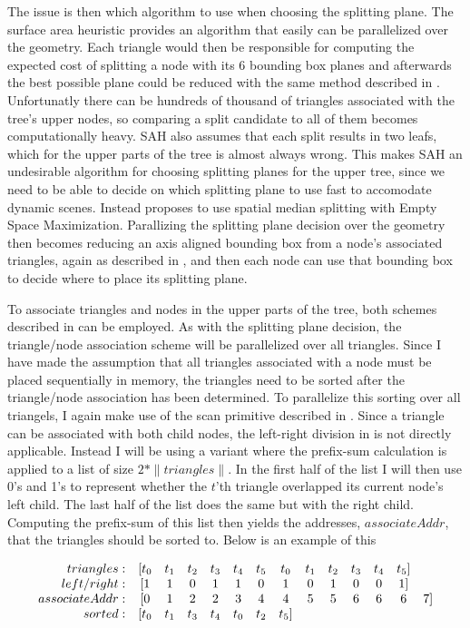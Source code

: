 The issue is then which algorithm to use when choosing the splitting plane. The
surface area heuristic provides an algorithm that easily can be parallelized
over the geometry. Each triangle would then be responsible for computing the
expected cost of splitting a node with its 6 bounding box planes and afterwards
the best possible plane could be reduced with the same method described in
. Unfortunatly there can be hundreds of thousand of
triangles associated with the tree's upper nodes, so comparing a split candidate
to all of them becomes computationally heavy. SAH also assumes that each split
results in two leafs, which for the upper parts of the tree is almost always
wrong. This makes SAH an undesirable algorithm for choosing splitting planes for
the upper tree, since we need to be able to decide on which splitting plane to
use fast to accomodate dynamic scenes. Instead \zhou{} proposes to use spatial
median splitting with Empty Space Maximization. Parallizing the splitting plane
decision over the geometry then becomes reducing an axis aligned bounding box
from a node's associated triangles, again as described in
, and then each node can use that bounding box to decide
where to place its splitting plane.

To associate triangles and nodes in the upper parts of the tree, both schemes
described in  can be employed. As with the
splitting plane decision, the triangle/node association scheme will be
parallelized over all triangles. Since I have made the assumption that all
triangles associated with a node must be placed sequentially in memory, the
triangles need to be sorted after the triangle/node association has been
determined. To parallelize this sorting over all triangels, I again make use of
the scan primitive described in . Since a triangle can
be associated with both child nodes, the left-right division in
 is not directly applicable. Instead I will be using a
variant where the prefix-sum calculation is applied to a list of size $2 *
\|triangles\|$. In the first half of the list I will then use 0's and 1's to
represent whether the $t$'th triangle overlapped its current node's left
child. The last half of the list does the same but with the right
child. Computing the prefix-sum of this list then yields the addresses,
$associateAddr$, that the triangles should be sorted to. Below is an example of
this

\begin{displaymath}
  \begin{array}{r c c c c c c c c c c c c c}
    triangles: & [t_0 & t_1 & t_2 & t_3 & t_4 & t_5 & t_0 & t_1 & t_2 & t_3 & t_4 & t_5]\\
    left/right: & [1 & 1 & 0 & 1 & 1 & 0 & 1 & 0 & 1 & 0 & 0 & 1]\\
    associateAddr: & [0 & 1 & 2 & 2 & 3 & 4 & 4 & 5 & 5 & 6 & 6 & 6 & 7]\\
    sorted: & [t_0 & t_1 & t_3 & t_4 & t_0 & t_2 & t_5]
  \end{array}
\end{displaymath}

